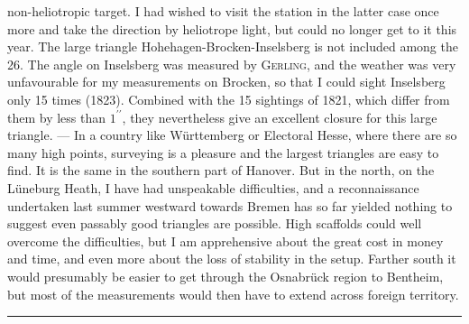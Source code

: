 \noindent non-heliotropic target.
I had wished to visit the station in the latter case once more and take the direction by heliotrope light, but could no longer get to it this year.
The large triangle Hohehagen-Brocken-Inselsberg is not included among the 26. The angle on Inselsberg was measured by \textsc{Gerling}, and the weather was very unfavourable for my measurements on Brocken, so that I could sight Inselsberg only 15 times (1823). Combined with the 15 sightings of 1821, which differ from them by less than \(1^{\prime\prime}\), they nevertheless give an excellent closure for this large triangle. --- In a country like Württemberg or Electoral Hesse, where there are so many high points, surveying is a pleasure and the largest triangles are easy to find.
It is the same in the southern part of Hanover.
But in the north, on the Lüneburg Heath, I have had unspeakable difficulties, and a reconnaissance undertaken last summer westward towards Bremen has so far yielded nothing to suggest even passably good triangles are possible.
High scaffolds could well overcome the difficulties, but I am apprehensive about the great cost in money and time, and even more about the loss of stability in the setup.
Farther south it would presumably be easier to get through the Osnabrück region to Bentheim, but most of the measurements would then have to extend across foreign territory.

\begin{center}\rule{.24\textwidth}{.4pt}\end{center}
